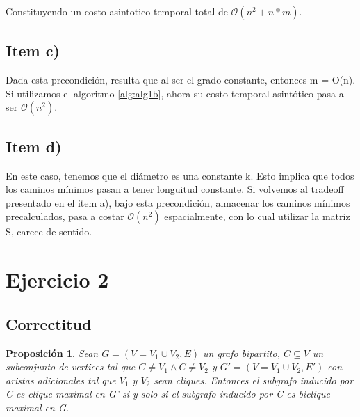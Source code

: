 \documentclass[10pt,a4paper]{article}
\newtheorem{proposition}{Proposici\'on}
\begin{document}
Constituyendo un costo asintotico temporal total de $\mathcal{O}(n^2 +n*m)$.

\subsection{Item c)}
Dada esta precondición, resulta que al ser el grado constante, entonces m = O(n). Si utilizamos el algoritmo \ref{alg:alg1b}, ahora su costo temporal asintótico pasa a ser $\mathcal{O}(n^2)$.

\subsection{Item d)}
En este caso, tenemos que el diámetro es una constante k. Esto implica que todos los caminos mínimos pasan a tener longuitud constante. Si volvemos al tradeoff presentado en el item a), bajo esta precondición, almacenar los caminos mínimos precalculados, pasa a costar $\mathcal{O}(n^2)$ espacialmente, con lo cual utilizar la matriz S, carece de sentido.

\section{Ejercicio 2}
\subsection{Correctitud}

\begin{proposition}
Sean $G = ( V = V_1 \cup V_2, E)$ un grafo bipartito, $C \subseteq V$ un subconjunto de vertices tal que $ C \neq V_1 \land C \neq V_2 $ y $G' = (V = V_1 \cup V_2, E')$ con aristas adicionales tal que $V_1$ y $V_2$ sean cliques. Entonces el subgrafo inducido por C es clique maximal en G' si y solo si el subgrafo inducido por C es biclique maximal en G.
\end{proposition}
\end{document}
